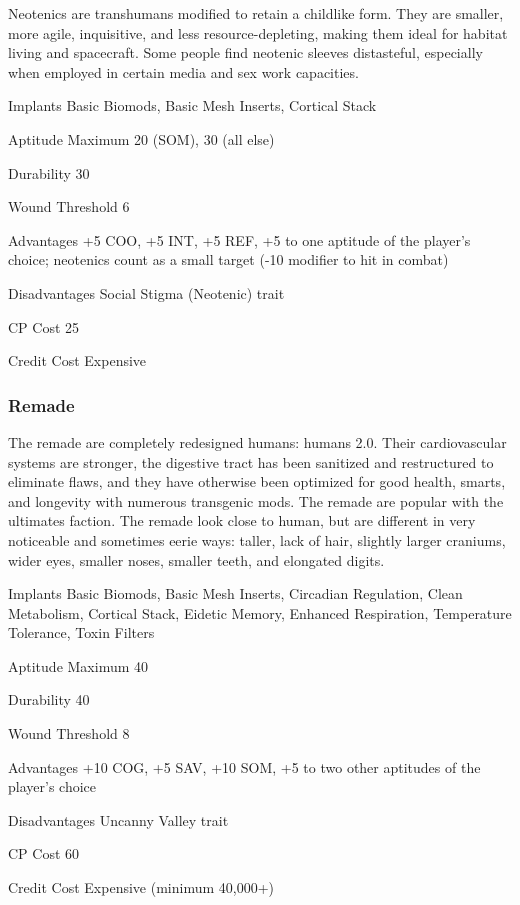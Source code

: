 Neotenics are transhumans modified to retain a childlike form. They are smaller, more agile, inquisitive, and less resource-depleting, making them ideal for habitat living and spacecraft. Some people find neotenic sleeves distasteful, especially when employed in certain media and sex work capacities. 

\begin{description*} \item[Implants] Basic Biomods, Basic Mesh Inserts, Cortical Stack \item[Aptitude Maximum] 20 (SOM), 30 (all else) \item[Durability] 30 \item[Wound Threshold] 6 \item[Advantages] +5 COO, +5 INT, +5 REF, +5 to one aptitude of the player’s choice; neotenics count as a small target (-10 modifier to hit in combat) \item[Disadvantages] Social Stigma (Neotenic) trait \item[CP Cost] 25 \item[Credit Cost] Expensive \end{description*} 

\subsubsection{Remade} \label{sec:starting-remade} 

The remade are completely redesigned humans: humans 2.0. Their cardiovascular systems are stronger, the digestive tract has been sanitized and restructured to eliminate flaws, and they have otherwise been optimized for good health, smarts, and longevity with numerous transgenic mods. The remade are popular with the ultimates faction. The remade look close to human, but are different in very noticeable and sometimes eerie ways: taller, lack of hair, slightly larger craniums, wider eyes, smaller noses, smaller teeth, and elongated digits. 

\begin{description*} \item[Implants] Basic Biomods, Basic Mesh Inserts, Circadian Regulation, Clean Metabolism, Cortical Stack, Eidetic Memory, Enhanced Respiration, Temperature Tolerance, Toxin Filters \item[Aptitude Maximum] 40 \item[Durability] 40 \item[Wound Threshold] 8 \item[Advantages] +10 COG, +5 SAV, +10 SOM, +5 to two other aptitudes of the player’s choice \item[Disadvantages] Uncanny Valley trait \item[CP Cost] 60 \item[Credit Cost] Expensive (minimum 40,000+) \end{description*} 

